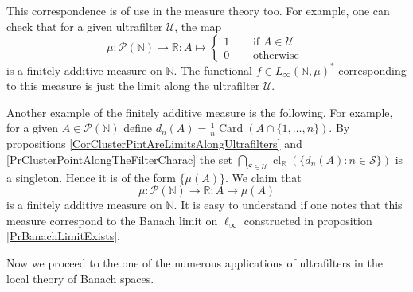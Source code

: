 \documentclass[12pt]{article}
\begin{document}
This correspondence is of use in the measure theory too. For example, one can check that for a given ultrafilter $\mathcal{U}$, the map
$$
\mu:\mathcal{P}(\mathbb{N})\to\mathbb{R}:A\mapsto\begin{cases} 1 &\quad\mbox{ if } A\in\mathcal{U}\\ 0&\quad\mbox{ otherwise }\end{cases}
$$
is a finitely additive measure on $\mathbb{N}$. The functional $f\in L_\infty(\mathbb{N}, \mu)^*$ corresponding to this measure is just the limit along the ultrafilter $\mathcal{U}$.

Another example of the finitely additive measure is the following. For example, for a given $A\in\mathcal{P}(\mathbb{N})$ define $d_n(A)=\frac{1}{n}\operatorname{Card}(A\cap \{1,\ldots,n\})$. By propositions \ref{CorClusterPintAreLimitsAlongUltrafilters} and \ref{PrClusterPointAlongTheFilterCharac} the set $\bigcap_{S\in\mathcal{U}}\operatorname{cl}_{\mathbb{R}}(\{d_n(A):n\in\mathcal{S}\})$ is a singleton. Hence it is of the form $\{\mu(A)\}$. We claim that
$$
\mu:\mathcal{P}(\mathbb{N})\to\mathbb{R}:A\mapsto\mu(A)
$$
is a finitely additive measure on $\mathbb{N}$. It is easy to understand if one notes that this measure correspond to the Banach limit on $\ell_\infty$ constructed in proposition \ref{PrBanachLimitExists}.

Now we proceed to the one of the numerous applications of ultrafilters in the local theory of Banach spaces.
\end{document}
